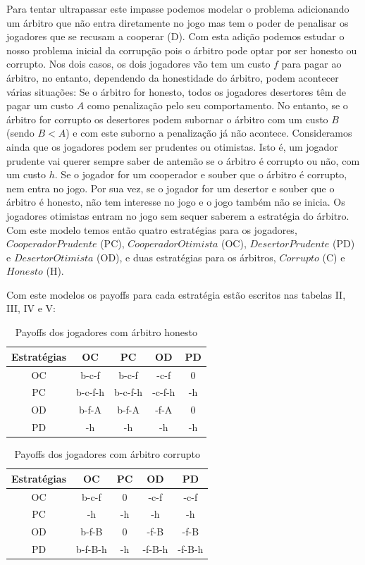 \documentclass[conference, twocolumn]{IEEEtran}
\theoremstyle{plain}
\theoremstyle{definition}
\theoremstyle{remark}
\begin{document}
    Para tentar ultrapassar este impasse podemos modelar o problema adicionando um árbitro que não entra diretamente no jogo mas tem o poder de penalisar os jogadores que se recusam a cooperar (D). Com esta adição podemos estudar o nosso problema inicial da corrupção pois o árbitro pode optar por ser honesto ou corrupto. Nos dois casos, os dois jogadores vão tem um custo $f$ para pagar ao árbitro, no entanto, dependendo da honestidade do árbitro, podem acontecer várias situações: Se o árbitro for honesto, todos os jogadores desertores têm de pagar um custo $A$ como penalização pelo seu comportamento. No entanto, se o árbitro for corrupto os desertores podem subornar o árbitro com um custo $B$ (sendo $B < A$) e com este suborno a penalização já não acontece.
    Consideramos ainda que os jogadores podem ser prudentes ou otimistas. Isto é, um jogador prudente vai querer sempre saber de antemão se o árbitro é corrupto ou não, com um custo $h$. Se o jogador for um cooperador e souber que o árbitro é corrupto, nem entra no jogo. Por sua vez, se o jogador for um desertor e souber que o árbitro é honesto, não tem interesse no jogo e o jogo também não se inicia. Os jogadores otimistas entram no jogo sem sequer saberem a estratégia do árbitro.
    Com este modelo temos então quatro estratégias para os jogadores, $Cooperador Prudente$ (PC), $Cooperador Otimista$ (OC), $Desertor Prudente$ (PD) e $Desertor Otimista$ (OD), e duas estratégias para os árbitros, $Corrupto$ (C) e $Honesto$ (H).

    Com este modelos os payoffs para cada estratégia estão escritos nas tabelas II, III, IV e V:

    \begin{table}[h]
        \centering
        \begin{tabular}{c|cccc}
            Estratégias&OC&PC&OD&PD\\
            \hline
            OC & b-c-f & b-c-f & -c-f & 0\\
            PC & b-c-f-h & b-c-f-h & -c-f-h & -h\\
            OD & b-f-A & b-f-A & -f-A & 0\\
            PD & -h & -h & -h & -h\\
        \end{tabular}
        \caption{Payoffs dos jogadores com árbitro honesto}
    \end{table}

    \begin{table}[h]
        \centering
        \begin{tabular}{c|cccc}
            Estratégias&OC&PC&OD&PD\\
            \hline
            OC & b-c-f & 0 & -c-f & -c-f\\
            PC & -h & -h & -h & -h\\
            OD & b-f-B & 0 & -f-B & -f-B\\
            PD & b-f-B-h & -h & -f-B-h & -f-B-h\\
        \end{tabular}
        \caption{Payoffs dos jogadores com árbitro corrupto}
    \end{table}
\end{document}
